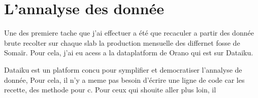 \section{L'annalyse des donnée}
Une des premiere tache que j'ai effectuer a été que recaculer a partir des donnée brute recolter sur chaque slab la production mensuelle des differnet fosse de Somaïr. Pour cela, j'ai eu acess a la dataplatform de Orano qui est sur Dataiku. 

Dataiku est un platform concu pour symplifier et democratiser l'annalyse de donnée, Pour cela, il n'y a meme pas besoin d'écrire une ligne de code car les recette, des methode pour c. Pour ceux qui shouite aller plus loin, il